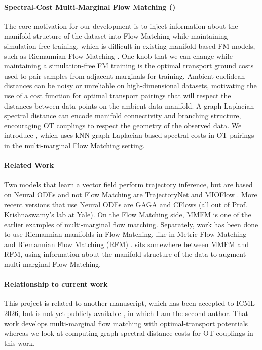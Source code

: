 \paragraph{Spectral-Cost Multi-Marginal Flow Matching (\ourmodel)} The core motivation for our development is to inject information about the manifold-structure of the dataset into Flow Matching while maintaining simulation-free training, which is difficult in existing manifold-based FM models, such as Riemannian Flow Matching \cite{chenFlowMatchingGeneral2024a}. One knob that we can change while maintaining a simulation-free FM training is the optimal transport ground costs used to pair samples from adjacent marginals for training. Ambient euclidean distances can be noisy or unreliable on high-dimensional datasets, motivating the use of a cost function for optimal transport pairings that will respect the distances between data points on the ambient data manifold. A graph Laplacian spectral distance can encode manifold connectivity and branching structure, encouraging OT couplings to respect the geometry of the observed data. We introduce \ourmodel, which uses kNN-graph-Laplacian-based spectral costs in OT pairings in the multi-marginal Flow Matching setting.

\paragraph{Related Work} Two models that learn a vector field perform trajectory inference, but are based on Neural ODEs and not Flow Matching are TrajectoryNet \cite{tongTrajectoryNetDynamicOptimal2020} and MIOFlow \cite{huguetMIOFlowManifoldInterpolating2022a}. More recent versions that use Neural ODEs are GAGA \cite{sunGAGAGeometryAwareGenerative2025} and CFlows \cite{sunCFlowsRevealingDynamic} (all out of Prof. Krishnaswamy's lab at Yale). On the Flow Matching side, MMFM \cite{rohbeckMODELINGCOMPLEXSYSTEM2025} is one of the earlier examples of multi-marginal flow matching. Separately, work has been done to use Riemannian manifolds in Flow Matching, like in Metric Flow Matching \cite{kapusniakMetricFlowMatchinga} and Riemannian Flow Matching (RFM) \cite{chenFlowMatchingGeneral2024}. \ourmodel sits somewhere between MMFM and RFM, using information about the manifold-structure of the data to augment multi-marginal Flow Matching.

\paragraph{Relationship to current work} This project is related to another manuscript, which has been accepted to ICML 2026, but is not yet publicly available \cite{kansalOTPFM2026}, in which I am the second author. That work develops multi-marginal flow matching with optimal-transport potentials whereas we look at computing graph spectral distance costs for OT couplings in this work.